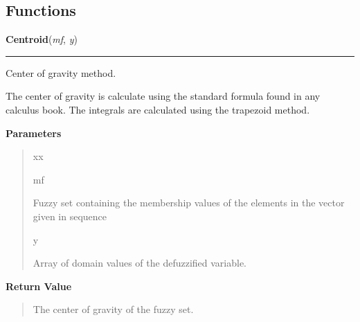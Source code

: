   \subsection{Functions}

    \label{peach:fuzzy:defuzzy:Centroid}

    \vspace{0.5ex}

    \begin{boxedminipage}{\textwidth}

    \raggedright \textbf{Centroid}(\textit{mf}, \textit{y})

    \vspace{-1.5ex}

    \rule{\textwidth}{0.5\fboxrule}

Center of gravity method.

The center of gravity is calculate using the standard formula found in any
calculus book. The integrals are calculated using the trapezoid method.
    \vspace{1ex}

      \textbf{Parameters}
      \begin{quote}
        \begin{Ventry}{xx}

          \item[mf]


Fuzzy set containing the membership values of the elements in the
vector given in sequence
          \item[y]


Array of domain values of the defuzzified variable.
        \end{Ventry}

      \end{quote}

    \vspace{1ex}

      \textbf{Return Value}
      \begin{quote}

The center of gravity of the fuzzy set.
      \end{quote}

    \vspace{1ex}

    \end{boxedminipage}

    \label{peach:fuzzy:defuzzy:Bissector}

